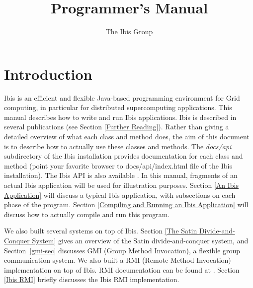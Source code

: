 \documentclass[10pt]{article}
\begin{document}
\title{
{}
{}
Programmer's Manual}

\author{The Ibis Group}

\maketitle

\section{Introduction}

Ibis is an efficient and flexible Java-based programming environment for Grid
computing, in particular for distributed supercomputing applications.
This manual describes how to write and run Ibis applications.
Ibis is described in several publications (see Section \ref{Further Reading}).
Rather than giving a detailed overview of what each class and method does,
the aim of this document is to describe how to actually use these classes
and methods.
The \emph{docs/api} subdirectory of the Ibis installation provides
documentation for each class and method (point your favorite browser
to docs/api/index.html file of the Ibis installation).
The Ibis API is also available
.
In this manual, fragments of an actual Ibis application will be used for illustration purposes.
Section \ref{An Ibis Application} will discuss a typical Ibis application,
with subsections on each phase of the program.
Section \ref{Compiling and Running an Ibis Application} will discuss how to
actually compile and run this program.

We also built several systems on top of Ibis.
Section \ref{The Satin Divide-and-Conquer System}
gives an overview of the Satin divide-and-conquer
system, and Section~\ref{gmi-sec} discusses GMI
(Group Method Invocation),
a flexible group communication system.
We also built a RMI (Remote Method Invocation)
implementation on top of Ibis. RMI documentation can be found at
{}
{}.
Section \ref{Ibis RMI} briefly discusses the Ibis RMI implementation.
\end{document}
